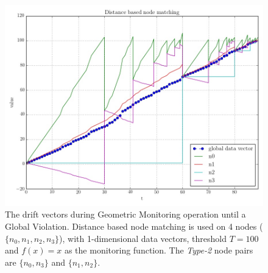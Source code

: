 \begin{figure}
\vspace*{-2cm}
        \centering
		\includegraphics[scale=0.35]{img/distoptpair_example_full.jpeg}
        \caption{The drift vectors during Geometric Monitoring operation until a Global Violation. Distance based node matching is used on 4 nodes ($\{n_0, n_1, n_2, n_3\}$), with 1-dimensional data vectors, threshold $T=100$ and $f(x)=x$ as the monitoring function. The \emph{Type-2} node pairs are $\{n_0, n_3\}$ and $\{n_1, n_2\}$.}\label{fig:distoptpair}
\end{figure}
